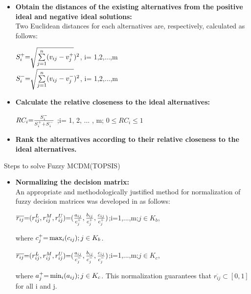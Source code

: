 \documentclass[serif, aspectratio=169]{beamer}
\newtheorem{thm co}{Theorem contd...}
\begin{document}
\begin{frame}
\begin{itemize}
\item \textbf{Obtain the distances of the existing alternatives from the positive ideal and negative ideal solutions:} \\
\hspace{1em}Two Euclidean distances for each alternatives are, respectively, calculated as follows:
\begin{center}
$S_{i}^{\text+}\text=\sqrt{\sum\limits_{j\text=1}^{n}(v_{ij}-v_{j}^{\text+}})^{2}$, i= 1,2,...,m\\
$S_{i}^{-}\text=\sqrt{\sum\limits_{j\text=1}^{n}(v_{ij}-v_{j}^{-}})^{2}$, i= 1,2,...,m 
\end{center}
\vspace{2mm}
\item \textbf{Calculate the relative closeness to the ideal alternatives:} 
\begin{center}
\vspace{2mm+}
$RC_{i}\text=\frac{S_{i}^{-}}{S_{i}^{\text+}\text+S^{-}_{i}}$ ;i= 1, 2, ... , m; $0\leq RC_{i}\leq 1$    
\end{center}
\vspace{2mm}
\item \textbf{Rank the alternatives according to their relative closeness to the ideal alternatives.}
\end{itemize}   
\end{frame}

\begin{frame}{Steps to solve Fuzzy MCDM(TOPSIS)}
\begin{itemize}
  
    \item \textbf{Normalizing the decision matrix:}\\
\hspace{1em}An appropriate and methodologically justified method for normalization of fuzzy decision matrices was developed in as follows:
\begin{center}
$\overline{r_{ij}}\text=(r_{ij}^{L},r_{ij}^{M},r_{ij}^{U})\text=(\frac{a_{ij}}{c_{j}^{\text+}},\frac{b_{ij}}{c_{j}^{\text+}},\frac{c_{ij}}{c_{j}^{\text+}})$;i=1,...,m;$j \in K_{b}$,
   
\end{center}

\hspace{1em}where $c^{\text+}_{j}\text=\max_{i}(c_{ij});j \in K_{b}$.

\begin{center}

$\overline{r_{ij}}\text=(r_{ij}^{L},r_{ij}^{M},r_{ij}^{U})\text=(\frac{a_{ij}}{c_{j}^{-}},\frac{b_{ij}}{c_{j}^{-}},\frac{c_{ij}}{c_{j}^{-}})$;i=1,...,m;$j \in K_{c}$,
    
\end{center}
\hspace{1em}where $a^{\text+}_{j}\text=\min_{i}(a_{ij});j \in K_{c}$.
This normalization guarantees that $\overline{r_{ij}}\subset [0,1]$ for all i and j.
\end{itemize}
\end{frame}
\end{document}
